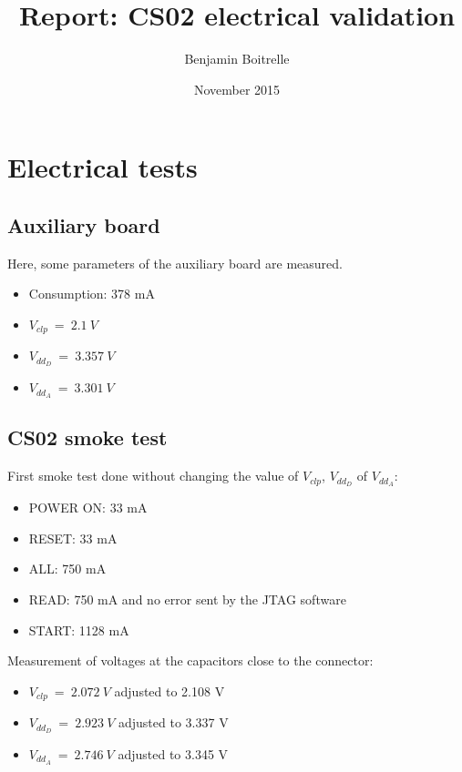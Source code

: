 \documentclass[a4papper, 10pt]{article}
\title{Report: CS02 electrical validation}
\author{Benjamin Boitrelle}
\date{November 2015}
\begin{document}
    \maketitle
    \tableofcontents

  \section{Electrical tests}
    \subsection{Auxiliary board}
    
   Here, some parameters of the auxiliary board are measured.
   \begin{itemize}
     \item Consumption: 378 mA
     \item $V_{clp} \ = \ 2.1 \ V$
     \item $V_{dd_D} \ = \ 3.357 \ V$
     \item $V_{dd_A} \ = \ 3.301 \ V$
   \end{itemize}

     \subsection{CS02 smoke test}

    First smoke test done without changing the value of  $V_{clp}$, $V_{dd_D}$ of $V_{dd_A}$:
     \begin{itemize}
       \item POWER ON: 33 mA
       \item RESET: 33 mA
       \item ALL: 750 mA
       \item READ: 750 mA and no error sent by the JTAG software
       \item START: 1128 mA
     \end{itemize}

     Measurement of voltages at the capacitors close to the connector:
     
     \begin{itemize}
       \item $V_{clp} \ = \ 2.072 \ V$ adjusted to 2.108 V
       \item $V_{dd_D} \ = \ 2.923 \ V$ adjusted to 3.337 V
       \item $V_{dd_A} \ = \ 2.746 \ V$ adjusted to 3.345 V
     \end{itemize}
\end{document}
